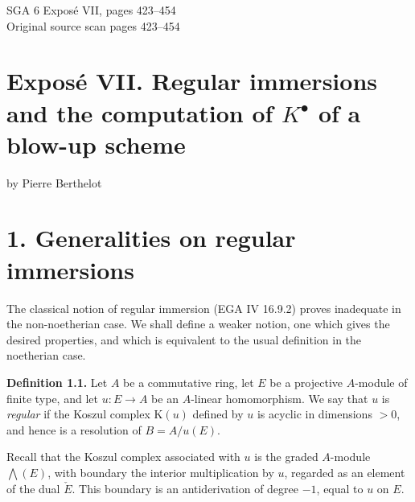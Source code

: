 \documentclass[11pt]{article}
\newcommand{\Tor}{\operatorname{Tor}}
\newcommand{\Spec}{\operatorname{Spec}}
\providecommand{\rad}{\operatorname{rad}}
\providecommand{\Tor}{\operatorname{Tor}}
\providecommand{\Ker}{\operatorname{Ker}}
\providecommand{\cO}{\mathcal O}
\begin{document}
\providecommand{\Kosz}{\mathrm K}
\providecommand{\Proj}{\operatorname{Proj}}
\providecommand{\Sym}{\operatorname{Sym}}
\providecommand{\gr}{\operatorname{gr}}
\providecommand{\Tor}{\operatorname{Tor}}
\providecommand{\Spec}{\operatorname{Spec}}
\providecommand{\Imf}{\operatorname{Im}}
\providecommand{\Ker}{\operatorname{Ker}}
\providecommand{\Id}{\operatorname{Id}}
\providecommand{\rad}{\operatorname{rad}}
\providecommand{\cO}{\mathcal O}
\providecommand{\cS}{\mathcal S}
\providecommand{\cJ}{\mathcal J}
\providecommand{\cN}{\mathcal N}
\providecommand{\bfP}{\mathbf P}
\providecommand{\bfA}{\mathbf A}

\begin{center}
{\Large SGA 6 Exposé VII, pages 423--454}\\[0.4em]
{\large Original source scan pages 423--454}
\end{center}


\section*{Exposé VII. Regular immersions and the computation of \texorpdfstring{$K^\bullet$}{K} of a blow-up scheme}
\begin{center}
by Pierre Berthelot
\end{center}

\section*{1. Generalities on regular immersions}

The classical notion of regular immersion (EGA IV 16.9.2) proves inadequate in the non-noetherian case. We shall define a weaker notion, one which gives the desired properties, and which is equivalent to the usual definition in the noetherian case.

\textbf{Definition 1.1.} Let \(A\) be a commutative ring, let \(E\) be a projective \(A\)-module of finite type, and let \(u:E\to A\) be an \(A\)-linear homomorphism. We say that \(u\) is \emph{regular} if the Koszul complex \(\Kosz(u)\) defined by \(u\) is acyclic in dimensions \(>0\), and hence is a resolution of \(B=A/u(E)\).

Recall that the Koszul complex associated with \(u\) is the graded \(A\)-module \(\bigwedge(E)\), with boundary the interior multiplication by \(u\), regarded as an element of the dual \(\check E\). This boundary is an antiderivation of degree \(-1\), equal to \(u\) on \(E\).
\end{document}
